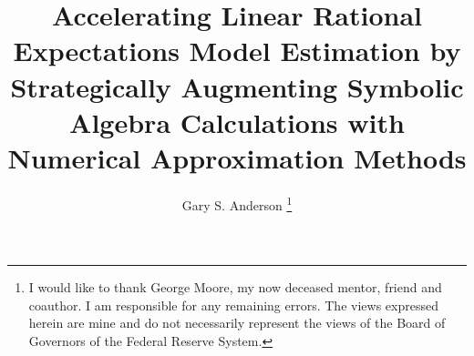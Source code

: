 \documentclass[12pt]{article}
\begin{document}
\title{ Accelerating Linear Rational Expectations Model Estimation by
Strategically Augmenting Symbolic Algebra Calculations with Numerical Approximation Methods}

\author{Gary S. Anderson
\thanks{I would like to thank George Moore, my now deceased mentor,
friend and coauthor.%
I am responsible for
any remaining errors.
The views expressed herein are mine and 
do not necessarily represent the views of the Board of Governors of the Federal
Reserve System.
}}

\maketitle



\makeatletter
\def\fullpath{\begingroup\everyeof{\noexpand}\@sanitize
  \edef\x{\@@input|"find `pwd` -name \jobname.tex" }%
  \edef\x{\endgroup\noexpand\zap@space\x\noexpand\@empty}\x}
\makeatother
\end{document}
